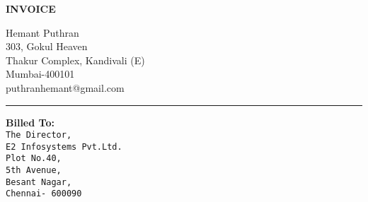\documentclass[]{invoice-style}
\begin{document}

\begin{minipage}[t][60em][c]{\textwidth}
\begin{minipage}[][12em][c]{\textwidth}
\begin{minipage}[][9em][c]{0.3\textwidth}
        {\Huge \textbf{INVOICE} }
\end{minipage}
\hfill
\begin{minipage}[][9em][c]{0.4\textwidth}
\begin{flushright}
        {\large Hemant Puthran\\ 303, Gokul Heaven\\Thakur Complex, Kandivali (E)\\Mumbai-400101\\ puthranhemant@gmail.com\\}
        \end{flushright}
\end{minipage}
\end{minipage}
\hrule
\begin{minipage}[][17em][c]{\textwidth} 
	\begin{minipage}[c][13em][t]{.49\textwidth} 
	\begin{center}
	    {\bfseries \Large Billed To:}\vspace{.25cm}\\{\Large {\tt The Director,\\E2 Infosystems Pvt.Ltd.\\
	    Plot No.40,\\ 5th Avenue,\\Besant Nagar,\vspace{.25cm}\\Chennai- 600090}}
	\end{center}
	\end{minipage}%
	\hfill
\begin{minipage}[c][13em][t]{.49\textwidth}   


\end{minipage}
\end{minipage}
\end{minipage}
\end{document}
